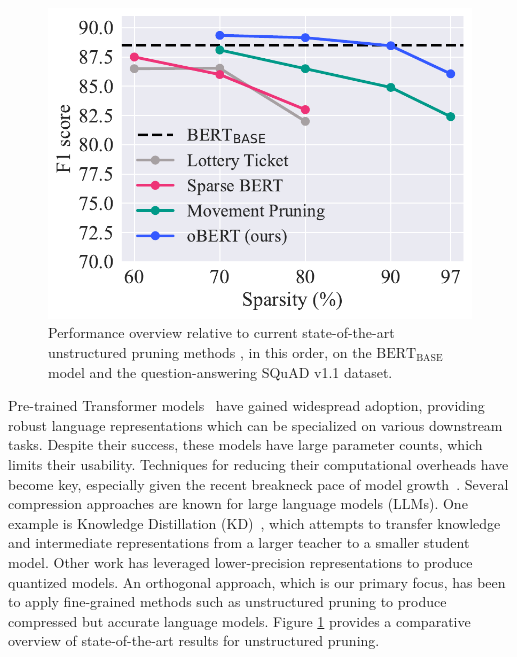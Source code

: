 \documentclass[11pt]{article}
\newcommand{\bert}{$\textrm{BERT}_{\textrm{BASE}}\,$}
\begin{document}
\begin{figure}[t]
    \centering
    \includegraphics[scale=0.5]{media/overview_squad_F1.pdf}
    \vspace{-1.2em}
    \caption{Performance overview relative to current state-of-the-art unstructured pruning methods  \cite{Chen2020TheLT} \cite{Xu2021RethinkingNP} \cite{Sanh2020MovementPA}, in this order, on the \bert model and the question-answering SQuAD v1.1 dataset.}
    \label{fig:squad_F1}
    \vspace{-2em}
\end{figure}

Pre-trained Transformer models~\cite{Vaswani2017AttentionIA, Devlin2019BERTPO} have gained widespread adoption, providing robust language representations which can be specialized on various downstream tasks. Despite their success, these models have large parameter counts, which limits their usability. Techniques for reducing their computational overheads have become key, especially given the recent breakneck pace of model growth~\cite{Radford2019LanguageMA, MTNLG}. 
Several compression approaches are known for large language models (LLMs). One example is Knowledge Distillation (KD)~\cite{Hinton2015DistillingTK}, which attempts to transfer knowledge and intermediate representations from a larger teacher to a smaller student model. Other work has leveraged lower-precision representations to produce quantized models. An orthogonal approach, which is our primary focus, has been to apply fine-grained methods such as unstructured pruning to produce compressed but accurate language models. Figure \ref{fig:squad_F1} provides a comparative overview of state-of-the-art results for unstructured pruning.
\end{document}
